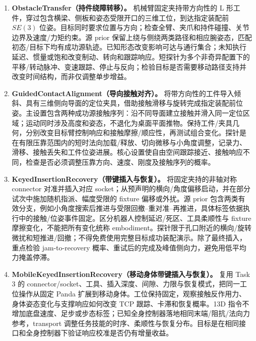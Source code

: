 \documentclass[11pt]{article}
\begin{document}
\begin{enumerate}[label=\textbf{Task \arabic*.},leftmargin=2.1em]
\item \textbf{ObstacleTransfer（持件绕障转移）。}
机械臂固定夹持带方向性的 L 形工件，穿过包含横梁、侧板和姿态受限开口的三维工位，到达指定装配前 $SE(3)$ 位姿。目标同时要求位置与方向；检查全臂、夹爪和持件碰撞、关节边界及速度/力矩约束。源 prior 保留上绕与侧绕两类路径和相应腕姿态，匹配初态/目标下均有成功源轨迹。已知形态改变影响可达与通行集合；未知执行延迟、惯量或饱和改变制动、转向和跟踪响应。短探针为多个非奇异配置下的平移/转动脉冲、变速跟踪、停止与反向；检验目标是否需要移动路径支持并改变时间结构，而非仅调整单步增益。

\item \textbf{GuidedContactAlignment（导向接触对齐）。}
将带方向性的工件导入倾斜、具有三维侧向导面的定位夹具，借助接触滑移与旋转完成指定装配前位姿。主设置包含两种成功源接触序列：沿不同导面建立接触并滑入同一定位区域；运动同时涉及高度和姿态，不退化为桌面平面推物。保持工件/夹具几何，分别改变目标臂控制响应和接触摩擦/顺应性，再测试组合变化。探针是在有限压靠范围内的短时法向加载/释放、切向微移与小角度调整，记录力、滑移、接触丢失和工件位姿进展。核心设置使自由空间跟踪接近、接触响应不同，检查是否必须调整压靠方向、速度、刚度及接触序列的概率。

\item \textbf{KeyedInsertionRecovery（带键插入与恢复）。}
将固定夹持的非轴对称 connector 对准并插入对应 socket；从预声明的横向/角度偏移启动，并在部分试次中施加随机指派、幅度受限的 fixture 偏移或外扰。源 prior 包含两类有效分支，例如小角度搜索后推进与受限回撤--重对准--再推进，具体标签依据执行中的接触/位姿事件固定。区分机器人控制延迟/死区、工具柔顺性与 fixture 摩擦变化，不能把所有变化统称 embodiment。探针限于孔口附近的横向/旋转微扰和短推进/回撤；不得免费使用完整目标成功装配演示。除了最终插入，重点检验 jam-to-recovery 概率、重试后的完成及峰值侧向力，避免用低平均力掩盖停滞。

\item \textbf{MobileKeyedInsertionRecovery（移动身体带键插入与恢复）。}
复用 Task 3 的 connector/socket、工具、插入深度、间隙、力限与恢复模式，把同一工位操作从固定 Panda 扩展到移动身体。工位保持固定，观察接触反作用力、身体姿态变化与支撑响应如何改变 TCP 跟踪、卡滞和恢复概率。13D 指令不增加底盘速度、足步或步态标签；已知全身控制器落地相同末端/阻抗/法向力参考，transport 调整任务技能的时序、柔顺性与恢复分布。目标是在相同接口和全身控制器下验证响应校准是否仍有增量收益。
\end{enumerate}
\end{document}

